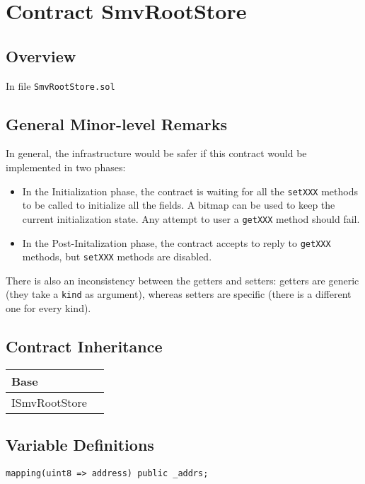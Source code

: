 
\chapter{Contract SmvRootStore}

\minitoc

\section{Overview}


In file {\tt SmvRootStore.sol}

\section{General Minor-level Remarks}

In general, the infrastructure would be safer if this contract would
be implemented in two phases:
\begin{itemize}
\item In the Initialization phase, the contract is waiting for all the
  {\tt setXXX} methods to be called to initialize all the fields. A
  bitmap can be used to keep the current initialization state. Any
  attempt to user a {\tt getXXX} method should fail.
\item In the Post-Initalization phase, the contract accepts to reply
  to {\tt getXXX} methods, but {\tt setXXX} methods are disabled.
\end{itemize}

There is also an inconsistency between the getters and setters:
getters are generic (they take a {\tt kind} as argument), whereas
setters are specific (there is a different one for every kind).

\section{Contract Inheritance}


\noindent\begin{tabular}{|l|p{5cm}|}\hline
Base & \\\hline
ISmvRootStore & \\\hline
\end{tabular}


\section{Variable Definitions}

\begin{lstlisting}[firstnumber=10]
    mapping(uint8 => address) public _addrs;
\end{lstlisting}

